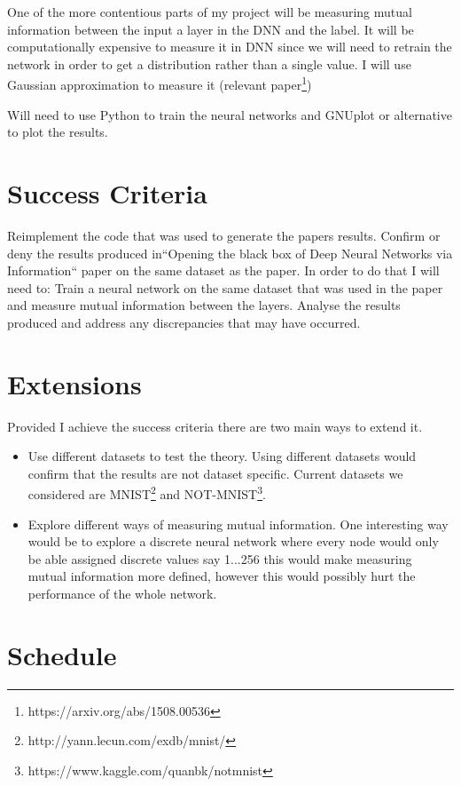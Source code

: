 \documentclass[12pt]{article}
\begin{document}
One of the more contentious parts of my project will be measuring mutual
information between the input a layer in the DNN and the label. It will be
computationally expensive to measure it in DNN since we will need to retrain the
network in order to get a distribution rather than a single value. I will use
Gaussian approximation to measure it (relevant
paper\footnote{https://arxiv.org/abs/1508.00536})

Will need to use Python to train the neural networks and GNUplot or alternative
to plot the results.

\section*{Success Criteria}

Reimplement the code that was used to generate the papers results. Confirm or
deny the results produced in``Opening the black box of Deep Neural Networks via
Information`` paper on the same dataset as the paper. In order to do that I will
need to: Train a neural network on the same dataset that was used in the paper
and measure mutual information between the layers. Analyse the results produced
and address any discrepancies that may have occurred.

\section*{Extensions}

Provided I achieve the success criteria there are two main ways to extend it.

\begin{itemize}
  \item {
      Use different datasets to test the theory. Using different datasets would
      confirm that the results are not dataset specific. Current datasets we
      considered are MNIST\footnote{http://yann.lecun.com/exdb/mnist/} and
      NOT-MNIST\footnote{https://www.kaggle.com/quanbk/notmnist}.
  }
  \item {
      Explore different ways of measuring mutual information. One interesting
      way would be to explore a discrete neural network where every node would
      only be able assigned discrete values say {1...256} this would make
      measuring mutual information more defined, however this would possibly
      hurt the performance of the whole network.
  }
\end{itemize}

\section*{Schedule}
\end{document}
